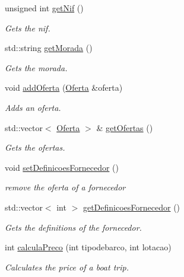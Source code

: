 \begin{DoxyCompactItemize}
unsigned int \hyperlink{classFornecedor_aec536b071f628fc1aa468071fa5a6067}{get\+Nif} ()
\begin{DoxyCompactList}\small\item\em Gets the nif. \end{DoxyCompactList}\item 
std\+::string \hyperlink{classFornecedor_ae71fba3a196f749f54956fdbb25ede6a}{get\+Morada} ()
\begin{DoxyCompactList}\small\item\em Gets the morada. \end{DoxyCompactList}\item 
void \hyperlink{classFornecedor_a220373fd19f44a30d7c6c1ec913be700}{add\+Oferta} (\hyperlink{classOferta}{Oferta} \&oferta)
\begin{DoxyCompactList}\small\item\em Adds an oferta. \end{DoxyCompactList}\item 
std\+::vector$<$ \hyperlink{classOferta}{Oferta} $>$ \& \hyperlink{classFornecedor_a7ef7f5f79e2c61aaca5d60c06b2a0051}{get\+Ofertas} ()
\begin{DoxyCompactList}\small\item\em Gets the ofertas. \end{DoxyCompactList}\item 
void \hyperlink{classFornecedor_a0a0945cbd2fd120d9eab5d5aec441b72}{set\+Definicoes\+Fornecedor} ()
\begin{DoxyCompactList}\small\item\em remove the oferta of a fornecedor \end{DoxyCompactList}\item 
std\+::vector$<$ int $>$ \hyperlink{classFornecedor_a94de4f30aa8328ce58dc1a8ec18e24c2}{get\+Definicoes\+Fornecedor} ()
\begin{DoxyCompactList}\small\item\em Gets the definitions of the fornecedor. \end{DoxyCompactList}\item 
int \hyperlink{classFornecedor_a53594b9690eb9ed098b5c9baa3d46c31}{calcula\+Preco} (int tipodebarco, int lotacao)
\begin{DoxyCompactList}\small\item\em Calculates the price of a boat trip. \end{DoxyCompactList}\item 
\mbox{\label{classFornecedor_a858875f921d2eebb652c4b7628f95c71}} 

\end{DoxyCompactItemize}
